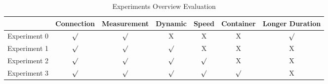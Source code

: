 \begin{table}[H]
    \centering
    \begin{tabular}{c|c|c|c|c|c|c}
        & Connection & Measurement& Dynamic & Speed & Container & Longer Duration\\
        \hline
        Experiment 0 & $\surd$ & $\surd$ & X & X & X & $\surd$\\
        \hline
        Experiment 1 & $\surd$ & $\surd$ & $\surd$ & X & X & X\\
        \hline
        Experiment 2 & $\surd$ & $\surd$ & $\surd$ & $\surd$ & X & X\\
        \hline
        Experiment 3 & $\surd$ & $\surd$ & $\surd$ & $\surd$ & $\surd$ & X\\
    \end{tabular}
    \caption{Experiments Overview Evaluation}
    \label{tab:Experiments Overview Evaluation}
\end{table}